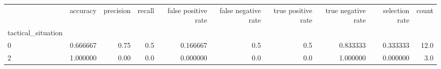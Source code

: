 \begin{tabular}{lrrrrrrrrr}
\toprule
{} &  accuracy &  precision &  recall &  false positive rate &  false negative rate &  true positive rate &  true negative rate &  selection rate &  count \\
tactical\_situation &           &            &         &                      &                      &                     &                     &                 &        \\
\midrule
0                  &  0.666667 &       0.75 &     0.5 &             0.166667 &                  0.5 &                 0.5 &            0.833333 &        0.333333 &   12.0 \\
2                  &  1.000000 &       0.00 &     0.0 &             0.000000 &                  0.0 &                 0.0 &            1.000000 &        0.000000 &    3.0 \\
\bottomrule
\end{tabular}
